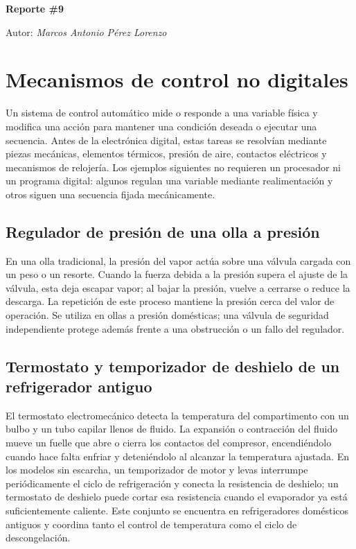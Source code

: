 \documentclass[12pt,a4paper]{article}
\begin{document}
\begin{titlepage}
  \centering
  {\huge\bfseries Reporte \#9\par}
  \vspace{1cm}
  {\Large Autor: \itshape Marcos Antonio Pérez Lorenzo\par}
\end{titlepage}

\pagebreak

\section{Mecanismos de control no digitales}

Un sistema de control automático mide o responde a una variable física y modifica una acción para mantener una condición deseada o ejecutar una secuencia. Antes de la electrónica digital, estas tareas se resolvían mediante piezas mecánicas, elementos térmicos, presión de aire, contactos eléctricos y mecanismos de relojería. Los ejemplos siguientes no requieren un procesador ni un programa digital: algunos regulan una variable mediante realimentación y otros siguen una secuencia fijada mecánicamente.

\subsection{Regulador de presión de una olla a presión}

En una olla tradicional, la presión del vapor actúa sobre una válvula cargada con un peso o un resorte. Cuando la fuerza debida a la presión supera el ajuste de la válvula, esta deja escapar vapor; al bajar la presión, vuelve a cerrarse o reduce la descarga. La repetición de este proceso mantiene la presión cerca del valor de operación. Se utiliza en ollas a presión domésticas; una válvula de seguridad independiente protege además frente a una obstrucción o un fallo del regulador.

\subsection{Termostato y temporizador de deshielo de un refrigerador antiguo}

El termostato electromecánico detecta la temperatura del compartimento con un bulbo y un tubo capilar llenos de fluido. La expansión o contracción del fluido mueve un fuelle que abre o cierra los contactos del compresor, encendiéndolo cuando hace falta enfriar y deteniéndolo al alcanzar la temperatura ajustada. En los modelos sin escarcha, un temporizador de motor y levas interrumpe periódicamente el ciclo de refrigeración y conecta la resistencia de deshielo; un termostato de deshielo puede cortar esa resistencia cuando el evaporador ya está suficientemente caliente. Este conjunto se encuentra en refrigeradores domésticos antiguos y coordina tanto el control de temperatura como el ciclo de descongelación.
\end{document}
